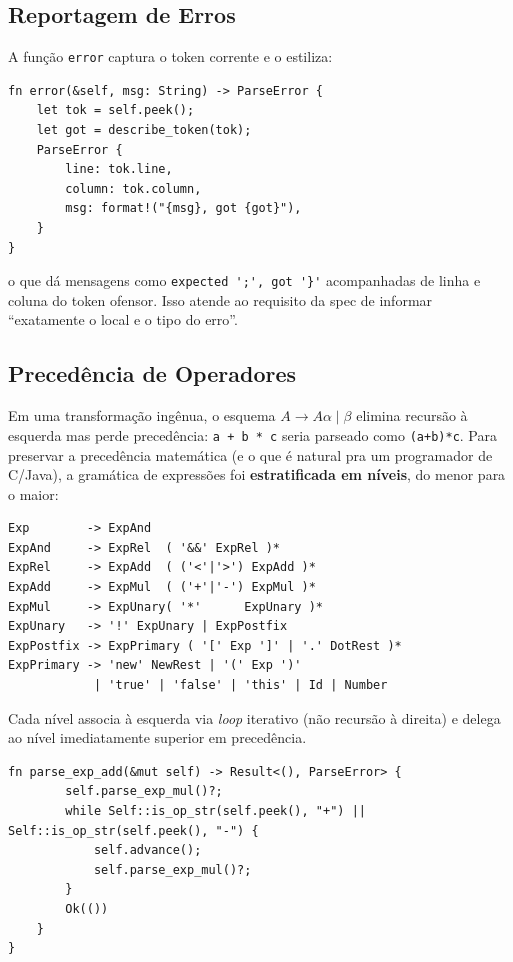 \documentclass[12pt,a4paper]{article}
\begin{document}
\subsection{Reportagem de Erros}

A função \texttt{error} captura o token corrente e o estiliza:

\begin{lstlisting}[caption={Erro com posição e descrição do token corrente}]
fn error(&self, msg: String) -> ParseError {
    let tok = self.peek();
    let got = describe_token(tok);
    ParseError {
        line: tok.line,
        column: tok.column,
        msg: format!("{msg}, got {got}"),
    }
}
\end{lstlisting}

\noindent o que dá mensagens como
\verb|expected ';', got '}'| acompanhadas de linha e coluna do
token ofensor. Isso atende ao requisito da spec de informar
``exatamente o local e o tipo do erro''.

\subsection{Precedência de Operadores}

Em uma transformação ingênua, o esquema $A \to A\alpha \mid \beta$
elimina recursão à esquerda mas perde precedência: \texttt{a + b * c}
seria parseado como \texttt{(a+b)*c}. Para preservar a precedência
matemática (e o que é natural pra um programador de C/Java), a
gramática de expressões foi \textbf{estratificada em níveis}, do
menor para o maior:

\begin{verbatim}
Exp        -> ExpAnd
ExpAnd     -> ExpRel  ( '&&' ExpRel )*
ExpRel     -> ExpAdd  ( ('<'|'>') ExpAdd )*
ExpAdd     -> ExpMul  ( ('+'|'-') ExpMul )*
ExpMul     -> ExpUnary( '*'      ExpUnary )*
ExpUnary   -> '!' ExpUnary | ExpPostfix
ExpPostfix -> ExpPrimary ( '[' Exp ']' | '.' DotRest )*
ExpPrimary -> 'new' NewRest | '(' Exp ')'
            | 'true' | 'false' | 'this' | Id | Number
\end{verbatim}

Cada nível associa à esquerda via \emph{loop} iterativo (não recursão
à direita) e delega ao nível imediatamente superior em precedência.

\begin{lstlisting}[caption={Nível \texttt{ExpAdd}: \texttt{+} e \texttt{-} associando à esquerda}]
    fn parse_exp_add(&mut self) -> Result<(), ParseError> {
        self.parse_exp_mul()?;
        while Self::is_op_str(self.peek(), "+") || Self::is_op_str(self.peek(), "-") {
            self.advance();
            self.parse_exp_mul()?;
        }
        Ok(())
    }
}
\end{lstlisting}
\end{document}
